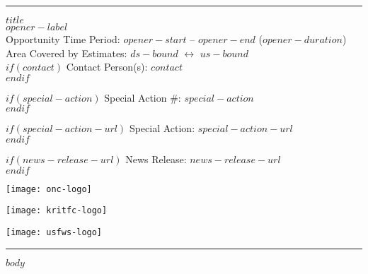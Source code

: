 \documentclass[letterpaper,11pt,$for(classoption)$$classoption$$sep$,$endfor$]{article}
\begin{document}
\rule{\textwidth}{1pt}
\begin{flushleft}

{\bf\LARGE{$title$}}\\
{\Large{$opener-label$}}\\

{\small{Opportunity Time Period: $opener-start$ -- $opener-end$ ($opener-duration$)}}\\

{\small{Area Covered by Estimates: $ds-bound$ \( \longleftrightarrow \) $us-bound$}}\\

$if(contact)$
{\small{Contact Person(s): $contact$}}\\
$endif$

$if(special-action)$
{\small{Special Action \#: $special-action$}}\\
$endif$

$if(special-action-url)$
{\small{Special Action: $special-action-url$}}\\
$endif$

$if(news-release-url)$
{\small{News Release: $news-release-url$}}\\
$endif$
\end{flushleft}

\begin{minipage}[ht]{0.33\textwidth}
\centering
\texttt{[image: onc-logo]}
\end{minipage}
\begin{minipage}[ht]{0.33\textwidth}
\centering
\texttt{[image: kritfc-logo]}
\end{minipage}
\begin{minipage}[ht]{0.33\textwidth}
\centering
\texttt{[image: usfws-logo]}
\end{minipage}

\rule{\textwidth}{1pt}

$body$

\end{document}
